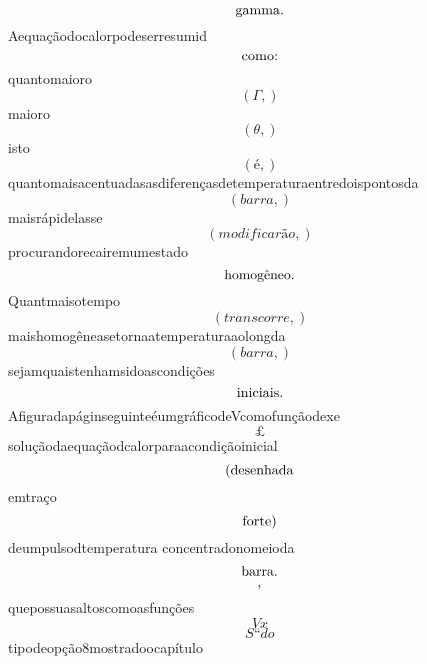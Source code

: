 \documentclass{article}
\begin{document}
\begin{equation}
$gamma.$
\end{equation}Aequaçãodocalorpodeserresumid\begin{equation}
$como:$
\end{equation}quantomaioro\begin{equation}
\left( \Gamma,\right)
\end{equation}maioro\begin{equation}
\left( \theta,\right)
\end{equation}isto\begin{equation}
\left( é,\right)
\end{equation}quantomaisacentuadasasdiferençasdetemperaturaentredoispontosda\begin{equation}
\left( barra,\right)
\end{equation}maisrápidelasse\begin{equation}
\left( modificarão,\right)
\end{equation}procurandorecairemumestado\begin{equation}
$homogêneo.$
\end{equation}Quantmaisotempo\begin{equation}
\left( transcorre,\right)
\end{equation}maishomogêneasetornaatemperaturaaolongda\begin{equation}
\left( barra,\right)
\end{equation}sejamquaistenhamsidoascondições\begin{equation}
$iniciais.$
\end{equation}AfiguradapáginseguinteéumgráficodeVcomofunçãodexe\begin{equation}
£
\end{equation}soluçãodaequaçãodcalorparaacondiçãoinicial\begin{equation}
$(desenhada$
\end{equation}emtraço\begin{equation}
$forte)$
\end{equation}deumpulsodtemperatura concentradonomeioda\begin{equation}
$barra.$
\end{equation}\begin{equation}
$,$
\end{equation}quepossuasaltoscomoasfunções\begin{equation}
V x
\end{equation}\begin{equation}
S“do
\end{equation}tipodeopção8mostradoocapítulo\begin{equation}

\end{equation}
\end{document}
